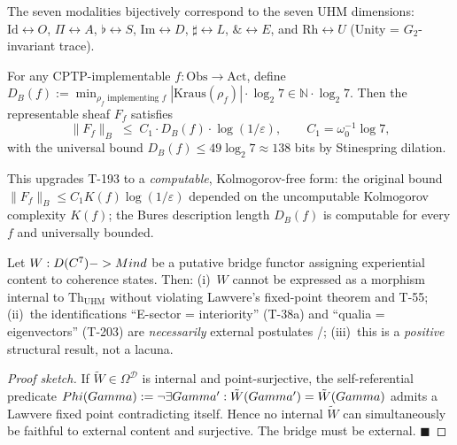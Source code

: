 The seven modalities bijectively correspond to the seven UHM
dimensions: $\mathrm{Id} \leftrightarrow O$, $\Pi \leftrightarrow A$,
$\flat \leftrightarrow S$, $\mathrm{Im} \leftrightarrow D$,
$\sharp \leftrightarrow L$, $\& \leftrightarrow E$, and
$\mathrm{Rh} \leftrightarrow U$ (Unity = $G_2$-invariant trace).

\begin{theorembox}
\label{thm:t213-bures-yoneda}
For any CPTP-implementable $f: \mathrm{Obs} \to \mathrm{Act}$, define
$D_B(f) := \min_{\rho_f \text{ implementing } f}
|\mathrm{Kraus}(\rho_f)| \cdot \log_2 7 \in \mathbb N \cdot \log_2 7$.
Then the representable sheaf $F_f$ satisfies
\[
  \|F_f\|_B \;\leq\; C_1 \cdot D_B(f) \cdot \log(1/\varepsilon),
  \qquad C_1 = \omega_0^{-1}\log 7,
\]
with the universal bound $D_B(f) \leq 49\log_2 7 \approx 138$ bits by
Stinespring dilation.
\end{theorembox}

This upgrades T-193 to a \emph{computable}, Kolmogorov-free form: the
original bound $\|F_f\|_B \leq C_1 K(f) \log(1/\varepsilon)$ depended on
the uncomputable Kolmogorov complexity $K(f)$; the Bures description
length $D_B(f)$ is computable for every $f$ and universally bounded.

\begin{theorembox}
\label{thm:t214-hard-problem}
Let $W: D(C^7) -> Mind$ be a putative bridge
functor assigning experiential content to coherence states. Then:
(i)~$W$ cannot be expressed as a morphism internal to
$\mathrm{Th}_{\mathrm{UHM}}$ without violating Lawvere's fixed-point
theorem and T-55;
(ii)~the identifications ``E-sector = interiority'' (T-38a) and
``qualia = eigenvectors'' (T-203) are \emph{necessarily} external
postulates /;
(iii)~this is a \emph{positive} structural result, not a lacuna.
\end{theorembox}

\begin{proof}[Proof sketch]
If $\tilde W \in \Omega^{\mathcal D}$ is internal and point-surjective,
the self-referential predicate
$Phi(Gamma) := \neg \exists Gamma': \tilde W(Gamma') = \tilde W(Gamma)$
admits a Lawvere fixed point contradicting itself. Hence no internal
$\tilde W$ can simultaneously be faithful to external content and
surjective. The bridge must be external. $\blacksquare$
\end{proof}

